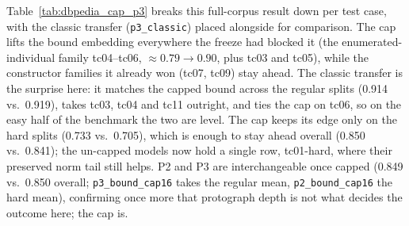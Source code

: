 \documentclass[a4paper,oneside,bibliography=totoc]{scrbook}
\begin{document}
Table~\ref{tab:dbpedia_cap_p3} breaks this full-corpus result down per test case,
with the classic transfer (\texttt{p3\_classic}) placed alongside for comparison.
The cap lifts the bound embedding everywhere the freeze had blocked it (the
enumerated-individual family tc04--tc06, $\approx 0.79 \rightarrow 0.90$, plus tc03
and tc05), while the constructor families it already won (tc07, tc09) stay ahead.
The classic transfer is the surprise here: it matches the capped bound across the
regular splits (0.914 vs.\ 0.919), takes tc03, tc04 and tc11 outright, and ties the
cap on tc06, so on the easy half of the benchmark the two are level. The cap keeps
its edge only on the hard splits (0.733 vs.\ 0.705), which is enough to stay ahead
overall (0.850 vs.\ 0.841); the un-capped models now hold a single row, tc01-hard,
where their preserved norm tail still helps. P2 and P3 are interchangeable once
capped (0.849 vs.\ 0.850 overall; \texttt{p3\_bound\_cap16} takes the regular mean,
\texttt{p2\_bound\_cap16} the hard mean), confirming once more that protograph depth
is not what decides the outcome here; the cap is.
\end{document}
